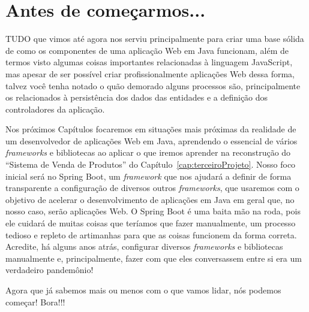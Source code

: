 \chapter*{Antes de começarmos...}

\lettrine[lines=4, lhang=0.1, lraise=0, loversize=0.2, findent=0.1em]{\textcolor{corTema}{T}}{UDO} que vimos até agora nos serviu principalmente para criar uma base sólida de como os componentes de uma aplicação Web em Java funcionam, além de termos visto algumas coisas importantes relacionadas à linguagem JavaScript, mas apesar de ser possível criar profissionalmente aplicações Web dessa forma, talvez você tenha notado o quão demorado alguns processos são, principalmente os relacionados à persistência dos dados das entidades e a definição dos controladores da aplicação.

Nos próximos Capítulos focaremos em situações mais próximas da realidade de um desenvolvedor de aplicações Web em Java, aprendendo o essencial de vários \textit{frameworks} e bibliotecas ao aplicar o que iremos aprender na reconstrução do ``Sistema de Venda de Produtos'' do Capítulo~\ref{cap:terceiroProjeto}. Nosso foco inicial será no Spring Boot, um \textit{framework} que nos ajudará a definir de forma transparente a configuração de diversos outros \textit{frameworks}, que usaremos com o objetivo de acelerar o desenvolvimento de aplicações em Java em geral que, no nosso caso, serão aplicações Web. O Spring Boot é uma baita mão na roda, pois ele cuidará de muitas coisas que teríamos que fazer manualmente, um processo tedioso e repleto de artimanhas para que as coisas funcionem da forma correta. Acredite, há alguns anos atrás, configurar diversos \textit{frameworks} e bibliotecas manualmente e, principalmente, fazer com que eles conversassem entre si era um verdadeiro pandemônio!

Agora que já sabemos mais ou menos com o que vamos lidar, nós podemos começar! Bora!!!
